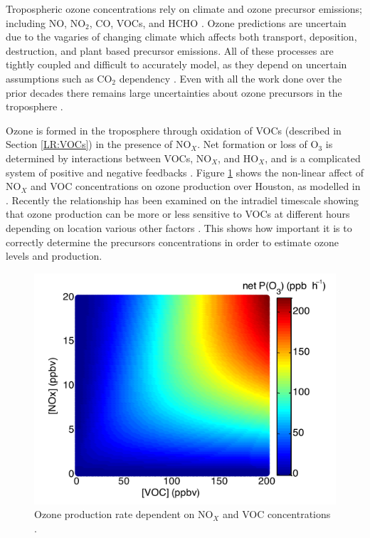     Tropospheric ozone concentrations rely on climate and ozone precursor emissions; including NO, NO$_2$, CO, VOCs, and HCHO \citep{Atkinson2000, Young2013, Marvin2017}. 
    Ozone predictions are uncertain due to the vagaries of changing climate which affects both transport, deposition, destruction, and plant based precursor emissions.
    All of these processes are tightly coupled and difficult to accurately model, as they depend on uncertain assumptions such as CO$_2$ dependency \citep{Young2013}.
    Even with all the work done over the prior decades there remains large uncertainties about ozone precursors in the troposphere \citep{Mazzuca2016}.
    
    
    Ozone is formed in the troposphere through oxidation of VOCs (described in Section \ref{LR:VOCs}) in the presence of NO$_X$.
    Net formation or loss of O$_3$ is determined by interactions between VOCs, NO$_X$, and HO$_X$, and is a complicated system of positive and negative feedbacks \citep{Atkinson2000}.
    Figure \ref{LR:VOCs:fig_NOXVOCOzone} shows the non-linear affect of NO$_X$ and VOC concentrations on ozone production over Houston, as modelled in \cite{Mazzuca2016}.
    Recently the relationship has been examined on the intradiel timescale showing that ozone production can be more or less sensitive to VOCs at different hours depending on location various other factors \citep{Mazzuca2016}.
    This shows how important it is to correctly determine the precursors concentrations in order to estimate ozone levels and production.
    
    \begin{figure}
      \includegraphics[width=.75\textwidth]{Figures/Mazzuca2016_NOxVOCOzone.png}
      \caption{Ozone production rate dependent on NO$_X$ and VOC concentrations \citep{Mazzuca2016}.}
      \label{LR:VOCs:fig_NOXVOCOzone}
    \end{figure}
    

